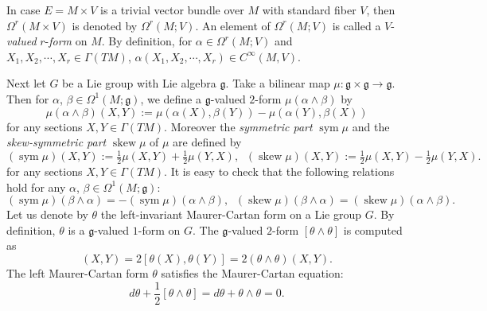 \documentclass[12pt]{amsart}
\theoremstyle{definition}
\theoremstyle{remark}
\numberwithin{equation}{section}
\begin{document}
 In case $E=M\times{V}$ is a trivial  vector bundle over $M$ with 
 standard fiber $V$, then $\Omega^{r}(M\times{V})$ is denoted by 
 $\Omega^{r}(M; V)$.
 An element of $\Omega^{r}(M; V)$ is called a $V$-\textit{valued} 
 $r$-\textit{form} on $M$.
 By definition, for $\alpha\in \Omega^{r}(M; V)$ 
 and $X_{1},X_{2},\cdots, X_{r}\in \varGamma(TM)$, 
 $\alpha(X_1,X_2,\cdots,X_r)\in C^{\infty}(M,V)$.

 Next let $G$ be a Lie group with Lie algebra $\mathfrak{g}$.
 Take a bilinear map $\mu:\mathfrak{g}\times \mathfrak{g}\to
 \mathfrak{g}$. 
 Then for $\alpha$, $\beta\in \Omega^{1}(M;\mathfrak{g})$, we define a
 $\mathfrak{g}$-valued $2$-form $\mu(\alpha\wedge \beta)$ by 
 \begin{equation*}
 \mu(\alpha\wedge \beta)(X,Y):=
 \mu(\alpha(X),\beta(Y))-\mu(\alpha(Y),\beta(X))
 \end{equation*}
 for any sections $X, Y  \in \varGamma(TM)$.
 Moreover the \textit{symmetric part} ${\operatorname {sym}} \mu$ and 
 the \textit{skew-symmetric part} ${\operatorname {skew}} \mu$ of $\mu$ are defined by
\begin{equation*}
({\operatorname {sym}} \mu) (X,Y) := \tfrac{1}{2}\mu (X,Y) + \tfrac{1}{2}
  \mu (Y,X), \;\;
 ({\operatorname {skew}} \mu )(X,Y):= \tfrac{1}{2}\mu (X,Y)
   - \tfrac{1}{2} \mu(Y,X).
\end{equation*}
 for any sections $X, Y  \in \varGamma(TM)$.
 It is easy to check that the following relations hold 
 for any $\alpha$, $\beta \in \Omega^{1}(M;\mathfrak{g})$:
\begin{equation}\label{eq:sym-skew}
  ({\operatorname {sym}} \mu) (\beta \wedge \alpha) = -   ({\operatorname {sym}} \mu) (\alpha \wedge \beta), \;\;
  ({\operatorname {skew}} \mu) (\beta \wedge \alpha) =  ({\operatorname {skew}} \mu) (\alpha \wedge \beta).
\end{equation}
 Let us denote by $\theta$ the left-invariant Maurer-Cartan form on 
 a Lie group $G$. 
 By definition, $\theta$ is a $\mathfrak{g}$-valued $1$-form on $G$. 
 The $\mathfrak{g}$-valued $2$-form $[\theta \wedge \theta]$ 
 is computed as
 \begin{equation*}
 [\theta \wedge \theta](X,Y)=2[\theta(X),\theta(Y)]=2(\theta\wedge \theta)(X,Y).
 \end{equation*}
 The left Maurer-Cartan form $\theta$ satisfies the Maurer-Cartan 
 equation:
 \begin{equation*}
 d\theta+\frac{1}{2}[\theta\wedge \theta]=
 d\theta+\theta \wedge \theta=0.
 \end{equation*}
\end{document}
